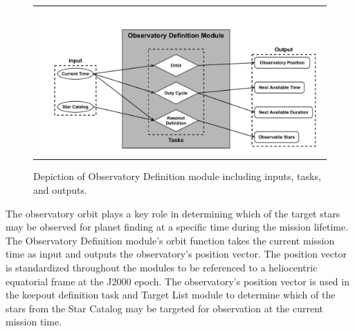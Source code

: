 \documentclass[]{asme2ej}
\begin{document}
\begin{figure}[ht]
    \begin{center}
        \begin{tabular}{c}
            \includegraphics[width=1\textwidth]{observatory2}
        \end{tabular}
   \end{center}
   \caption 
   { \label{fig:observatory} Depiction of Observatory Definition module including inputs, tasks, and outputs. } 
\end{figure} 

The observatory orbit plays a key role in determining which of the target stars may be observed for planet finding at a specific time during the mission lifetime. The Observatory Definition module's orbit function takes the current mission time as input and outputs the observatory's position vector. The position vector is standardized throughout the modules to be referenced to a heliocentric equatorial frame at the J2000 epoch. The observatory's position vector is used in the keepout definition task and Target List module to determine which of the stars from the Star Catalog may be targeted for observation at the current mission time.
\end{document}
